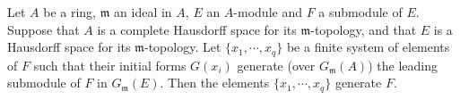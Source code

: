 Let $A$ be a ring, $\mathfrak{m}$ an ideal in $A$, $E$ an $A$-module and $F$ a submodule of $E$. Suppose that $A$ is a complete Hausdorff space for its $\mathfrak{m}$-topology, and that $E$ is a Hausdorff space for its $\mathfrak{m}$-topology. Let $\{x_1, \cdots, x_q\}$ be a finite system of elements of $F$ such that their initial forms $G(x_i)$ generate (over $G_{\mathfrak{m}}(A)$) the leading submodule of $F$ in $G_{\mathfrak{m}}(E)$. Then the elements $\{x_1, \cdots, x_q\}$ generate $F$.